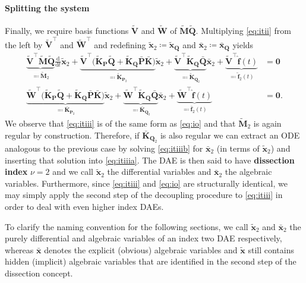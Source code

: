 \documentclass[AMA,STIX1COL]{WileyNJD-v2}
\newcommand{\mb}[1]{\mathbf{#1}}
\newcommand{\mbt}[1]{\tilde{\mathbf{#1}}}
\newcommand{\mbb}[1]{\bar{\mathbf{#1}}}
\newcommand{\mbh}[1]{\hat{\mathbf{#1}}}
\newcommand{\T}{{\!\top}}
\newcommand{\ddt}{\frac{\mathrm{d}}{\mathrm{d}t}}
\begin{document}
\paragraph{Splitting the system}
Finally, we require basis functions $\mbt{V}$ and $\mbt{W}$ of $\mbt{M} \mbt{Q}$. Multiplying \eqref{eq:itii} from the left by $\mbt{V}^{\T}$ and $\mbt{W}^{\T}$ and redefining $\mbt{x}_2 \coloneqq \mbt{x}_\mb{Q}$ and $\mbb{x}_2 \coloneqq \mbb{x}_\mb{Q}$ yields
\begin{subequations}
    \label{eq:itiii}
    \begin{align}
            \underbrace{\mbt{V}^{\T} \mbt{M} \mbt{Q}}_{\eqqcolon \mbt{M}_2} \ddt \mbt{x}_2 + \underbrace{\mbt{V}^{\T} \big( \mbt{K}_\mb{P} \mbt{Q} + \mbt{K}_\mb{Q} \mbb{P} \mbb{K} \big)}_{\eqqcolon \mbt{K}_{\mb{P}_2}} \mbt{x}_2 + \underbrace{\mbt{V}^{\T} \mbt{K}_\mb{Q} \mbb{Q}}_{\eqqcolon \mbt{K}_{\mb{Q}_2}} \mbb{x}_2 + \underbrace{\mbt{V}^{\T} \mbh{f}(t)}_{\eqqcolon \mbt{f}_2(t)} &= \mb{0} \label{eq:itiiia}\\
            \underbrace{\mbt{W}^{\T} \big( \mbt{K}_\mb{P} \mbt{Q} + \mbt{K}_\mb{Q} \mbb{P} \mbb{K} \big)}_{\eqqcolon \mbb{K}_{\mb{P}_2}} \mbt{x}_2 + \underbrace{\mbt{W}^{\T} \mbt{K}_\mb{Q} \mbb{Q}}_{\eqqcolon \mbb{K}_{\mb{Q}_2}} \mbb{x}_2 + \underbrace{\mbt{W}^{\T} \mbh{f}(t)}_{\eqqcolon \mbb{f}_2(t)} &= \mb{0}. \label{eq:itiiib}
    \end{align}
\end{subequations}
We observe that \eqref{eq:itiii} is of the same form as \eqref{eq:io} and that $\mbt{M}_2$ is again regular by construction. Therefore, if $\mbb{K}_{\mb{Q}_2}$ is also regular we can extract an ODE analogous to the previous case by solving \eqref{eq:itiiib} for $\mbb{x}_2$ (in terms of $\mbt{x}_2$) and inserting that solution into \eqref{eq:itiiia}. The DAE is then said to have \textbf{dissection index} $\nu = 2$ and we call $\mbt{x}_2$ the differential variables and $\mbb{x}_2$ the algebraic variables. Furthermore, since \eqref{eq:itiii} and \eqref{eq:io} are structurally identical, we may simply apply the second step of the decoupling procedure to \eqref{eq:itiii} in order to deal with even higher index DAEs.

To clarify the naming convention for the following sections, we call $\mbt{x}_2$ and $\mbb{x}_2$ the purely differential and algebraic variables of an index two DAE respectively, whereas $\mbb{x}$ denotes the explicit (obvious) algebraic variables and $\mbt{x}$ still contains hidden (implicit) algebraic variables that are identified in the second step of the dissection concept.
\end{document}
